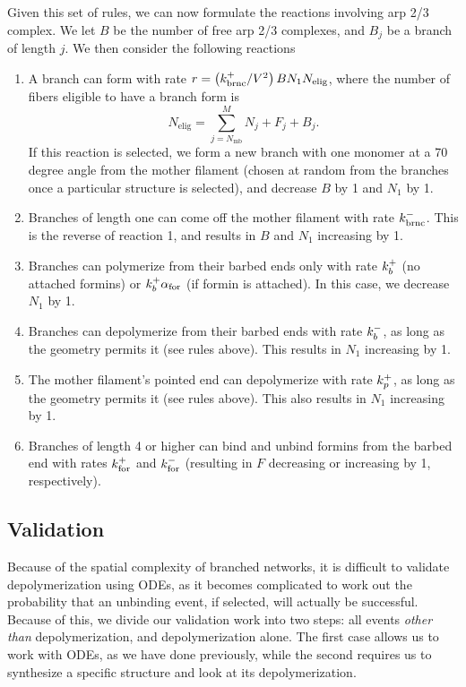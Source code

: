 \documentclass[11pt]{article}
\begin{document}
Given this set of rules, we can now formulate the reactions involving arp 2/3 complex. We let $B$ be the number of free arp 2/3 complexes, and $B_j$ be a branch of length $j$. We then consider the following reactions
\begin{enumerate}
\item A branch can form with rate $r=\left(k_\text{brnc}^+/V^2\right) B N_1 N_\text{elig}$, where the number of fibers eligible to have a branch form is
\begin{equation}
\label{eq:NBElig}
N_\text{elig}=\sum_{j=N_\text{mb}}^M N_j+F_j +B_j.
\end{equation}
If this reaction is selected, we form a new branch with one monomer at a 70 degree angle from the mother filament (chosen at random from the branches once a particular structure is selected), and decrease $B$ by 1 and $N_1$ by 1. 
\item Branches of length one can come off the mother filament with rate $k_\text{brnc}^-$. This is the reverse of reaction 1, and results in $B$ and $N_1$ increasing by 1.
\item Branches can polymerize from their barbed ends only with rate $k_b^+$ (no attached formins) or $k_b^+ \alpha_\text{for}$ (if formin is attached). In this case, we decrease $N_1$ by 1. 
\item Branches can depolymerize from their barbed ends with rate $k_b^-$, as long as the geometry permits it (see rules above). This results in $N_1$ increasing by 1.   
\item The mother filament's pointed end can depolymerize with rate $k_p^+$, as long as the geometry permits it (see rules above). This also results in $N_1$ increasing by 1.   
\item Branches of length 4 or higher can bind and unbind formins from the barbed end with rates $k_\text{for}^+$ and $k_\text{for}^-$ (resulting in $F$ decreasing or increasing by 1, respectively). 
\end{enumerate}

\subsection{Validation}
Because of the spatial complexity of branched networks, it is difficult to validate depolymerization using ODEs, as it becomes complicated to work out the probability that an unbinding event, if selected, will actually be successful. Because of this, we divide our validation work into two steps: all events \emph{other than} depolymerization, and depolymerization alone. The first case allows us to work with ODEs, as we have done previously, while the second requires us to synthesize a specific structure and look at its depolymerization. 
\end{document}
